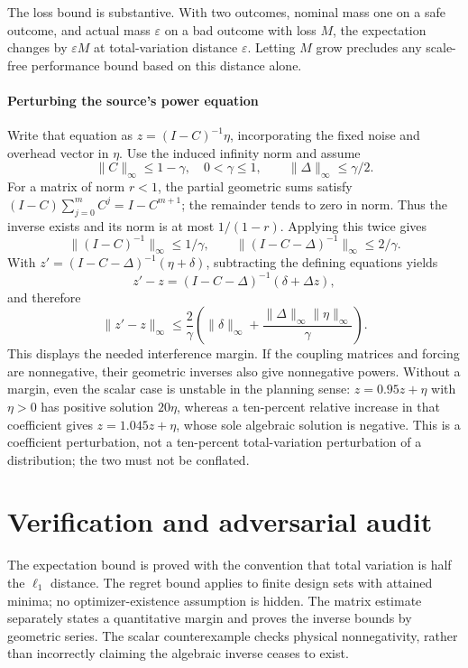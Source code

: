 \documentclass[11pt]{article}
\begin{document}
The loss bound is substantive. With two outcomes, nominal mass one on a safe outcome, and actual mass $\varepsilon$ on a bad outcome with loss $M$, the expectation changes by $\varepsilon M$ at total-variation distance $\varepsilon$. Letting $M$ grow precludes any scale-free performance bound based on this distance alone.

\paragraph{Perturbing the source's power equation}
Write that equation as $z=(I-C)^{-1}\eta$, incorporating the fixed noise and overhead vector in $\eta$. Use the induced infinity norm and assume
\[
 \lVert C\rVert_\infty\leq1-\gamma,\quad 0<\gamma\leq1,\qquad
 \lVert\Delta\rVert_\infty\leq\gamma/2.
\]
For a matrix of norm $r<1$, the partial geometric sums satisfy $(I-C)\sum_{j=0}^mC^j=I-C^{m+1}$; the remainder tends to zero in norm. Thus the inverse exists and its norm is at most $1/(1-r)$. Applying this twice gives
\[
 \lVert(I-C)^{-1}\rVert_\infty\leq1/\gamma,\qquad
 \lVert(I-C-\Delta)^{-1}\rVert_\infty\leq2/\gamma.
\]
With $z'=(I-C-\Delta)^{-1}(\eta+\delta)$, subtracting the defining equations yields
\[
 z'-z=(I-C-\Delta)^{-1}(\delta+\Delta z),
\]
and therefore
\[
 \lVert z'-z\rVert_\infty
 \leq\frac2\gamma\left(\lVert\delta\rVert_\infty+
 \frac{\lVert\Delta\rVert_\infty\lVert\eta\rVert_\infty}{\gamma}\right).
\]
This displays the needed interference margin. If the coupling matrices and forcing are nonnegative, their geometric inverses also give nonnegative powers. Without a margin, even the scalar case is unstable in the planning sense: $z=0.95z+\eta$ with $\eta>0$ has positive solution $20\eta$, whereas a ten-percent relative increase in that coefficient gives $z=1.045z+\eta$, whose sole algebraic solution is negative. This is a coefficient perturbation, not a ten-percent total-variation perturbation of a distribution; the two must not be conflated.

\section{Verification and adversarial audit}
The expectation bound is proved with the convention that total variation is half the $\ell_1$ distance. The regret bound applies to finite design sets with attained minima; no optimizer-existence assumption is hidden. The matrix estimate separately states a quantitative margin and proves the inverse bounds by geometric series. The scalar counterexample checks physical nonnegativity, rather than incorrectly claiming the algebraic inverse ceases to exist.
\end{document}
